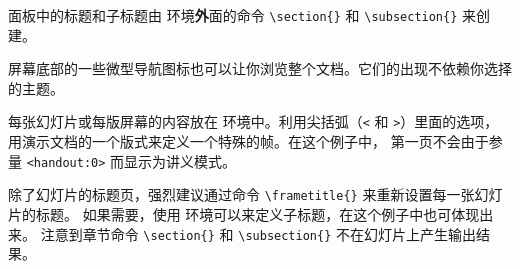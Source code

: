 面板中的标题和子标题由  环境{\textbf
外面}的命令 \verb|\section{}| 和 \verb|\subsection{}| 来创建。


屏幕底部的一些微型导航图标也可以让你浏览整个文档。它们的出现不依赖你选择的主题。


每张幻灯片或每版屏幕的内容放在  环境中。利用尖括弧（\verb|<| 
和 \verb|>|）里面的选项，用演示文档的一个版式来定义一个特殊的帧。在这个例子中，
第一页不会由于参量 \verb|<handout:0>| 而显示为讲义模式。


除了幻灯片的标题页，强烈建议通过命令 \verb|\frametitle{}| 来重新设置每一张幻灯片的标题。
如果需要，使用  环境可以来定义子标题，在这个例子中也可体现出来。
注意到章节命令 \verb|\section{}| 和 \verb|\subsection{}| 不在幻灯片上产生输出结果。

